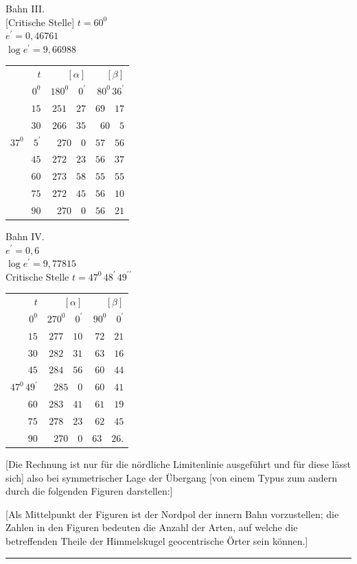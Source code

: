 \begin{center}
Bahn III.\\[3pt]
[Critische Stelle] \(t=60^{0}\)\\
\(e^{\prime}=0{,}46761\)\\
\(\log e^{\prime}=9{,}66988\)\par\smallskip
\begin{tabular}{r@{\qquad}r@{\qquad}r}
\(t\)&\([\alpha]\)&\([\beta]\)\\[3pt]
\(0^{0}\)&\(180^{0}\quad0^{\prime}\)&\(80^{0}\,36^{\prime}\)\\
\(15\)&\(251\quad27\)&\(69\quad17\)\\
\(30\)&\(266\quad35\)&\(60\quad5\)\\
\(37^{0}\quad5^{\prime}\)&\(270\quad0\)&\(57\quad56\)\\
\(45\)&\(272\quad23\)&\(56\quad37\)\\
\(60\)&\(273\quad58\)&\(55\quad55\)\\
\(75\)&\(272\quad45\)&\(56\quad10\)\\
\(90\)&\(270\quad0\)&\(56\quad21\)
\end{tabular}
\end{center}
\begin{center}
Bahn IV.\\[3pt]
\(e^{\prime}=0{,}6\)\\
\(\log e^{\prime}=9{,}77815\)\\
Critische Stelle \(t=47^{0}\,48^{\prime}\,49^{\prime\prime}\)\par\smallskip
\begin{tabular}{r@{\qquad}r@{\qquad}r}
\(t\)&\([\alpha]\)&\([\beta]\)\\[3pt]
\(0^{0}\)&\(270^{0}\quad0^{\prime}\)&\(90^{0}\quad0^{\prime}\)\\
\(15\)&\(277\quad10\)&\(72\quad21\)\\
\(30\)&\(282\quad31\)&\(63\quad16\)\\
\(45\)&\(284\quad56\)&\(60\quad44\)\\
\(47^{0}\,49^{\prime}\)&\(285\quad0\)&\(60\quad41\)\\
\(60\)&\(283\quad41\)&\(61\quad19\)\\
\(75\)&\(278\quad23\)&\(62\quad45\)\\
\(90\)&\(270\quad0\)&\(63\quad26.\)
\end{tabular}
\end{center}

[Die Rechnung ist nur für die nördliche Limitenlinie ausgeführt und für diese lässt sich] also bei symmetrischer Lage der Übergang [von einem Typus zum andern durch die folgenden Figuren darstellen:]

[Als Mittelpunkt der Figuren ist der Nordpol der innern Bahn vorzustellen; die Zahlen in den Figuren bedeuten die Anzahl der Arten, auf welche die betreffenden Theile der Himmelskugel geocentrische Örter sein können.]
\begin{center}\rule{.22\textwidth}{.3pt}\end{center}
